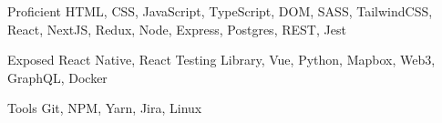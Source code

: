 
\begin{cvskills}
  \cvskill
    {Proficient} %
    {HTML, CSS, JavaScript, TypeScript, DOM, SASS, TailwindCSS, React, NextJS, Redux, Node, Express, Postgres, REST, Jest} %

  \cvskill
    {Exposed} %
    {React Native, React Testing Library, Vue, Python, Mapbox, Web3, GraphQL, Docker} %

  \cvskill
    {Tools} %
    {Git, NPM, Yarn, Jira, Linux} %
\end{cvskills}
